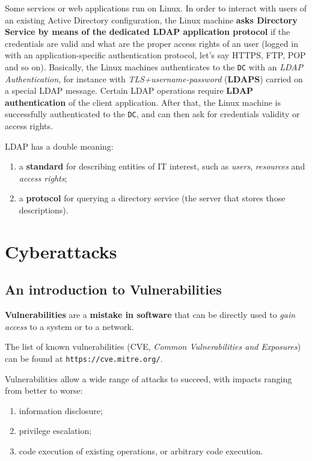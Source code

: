 \documentclass[10pt]{extreport}
\begin{document}
Some services or web applications run on Linux. In order to interact with users
of an existing Active Directory configuration, the Linux machine \textbf{asks
Directory Service by means of the dedicated LDAP application protocol} if the
credentials are valid and what are the proper access rights of an user (logged
in with an application\--specific authentication protocol, let's say HTTPS,
FTP, POP and so on). Basically, the Linux machines authenticates to the
\texttt{DC} with an \emph{LDAP Authentication}, for instance with
\emph{TLS+username\--password} (\textbf{LDAPS}) carried on a special LDAP
message. Certain LDAP operations require \textbf{LDAP authentication} of the
client application. After that, the Linux machine is successfully authenticated
to the \texttt{DC}, and can then ask for credentials validity or access rights.


LDAP has a double meaning:
\begin{enumerate}
    \item a \textbf{standard} for describing entities of IT interest, such as
        \emph{users}, \emph{resources} and \emph{access rights};
    \item a \textbf{protocol} for querying a directory service (the server that
        stores those descriptions).
\end{enumerate}





\part{Cyberattacks}

\chapter{An introduction to Vulnerabilities}

\textbf{Vulnerabilities} are a \textbf{mistake in software} that can be
directly used to \emph{gain access} to a system or to a network.

The list of known vulnerabilities (CVE, \emph{Common Vulnerabilities and
Exposures}) can be found at \texttt{https://cve.mitre.org/}.

Vulnerabilities allow a wide range of attacks to succeed, with impacts ranging
from better to worse:
\begin{enumerate}
    \item information disclosure;
    \item privilege escalation;
    \item code execution of existing operations, or arbitrary code execution.
\end{enumerate}
\end{document}
